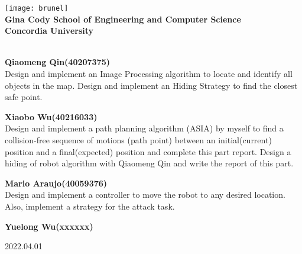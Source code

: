\begin{titlepage}
  \begin{center}
    \texttt{[image: brunel]}\\[1cm]

    \textbf{\large Gina Cody School of Engineering and Computer Science}\\[0.5cm]

      \textbf{\LARGE Concordia University}\\[0.75cm]
      \textbf{\LARGE \Title}\\[0.75cm]

  \end{center}

\textbf{\large Qiaomeng Qin(40207375)}\\[0.5cm]
Design and implement an Image Processing algorithm to locate and identify all objects in the map. Design and implement an Hiding Strategy to find the closest safe point.

\textbf{\large Xiaobo Wu(40216033)}\\[0.5cm]
Design and implement a path planning algorithm (ASIA) by myself to find a collision-free sequence of motions (path point) between an initial(current) position and a final(expected) position and complete this part report. Design a hiding of robot algorithm with Qiaomeng Qin and write the report of this part.

\textbf{\large Mario Araujo(40059376)}\\[0.5cm]
Design and implement a controller to move the robot to any desired location. Also, implement a strategy for the attack task.

\textbf{\large Yuelong Wu(xxxxxx)}\\[0.5cm]

\begin{center}
\textsc{\footnotesize{2022.04.01}}\\
\end{center}

\end{titlepage}
